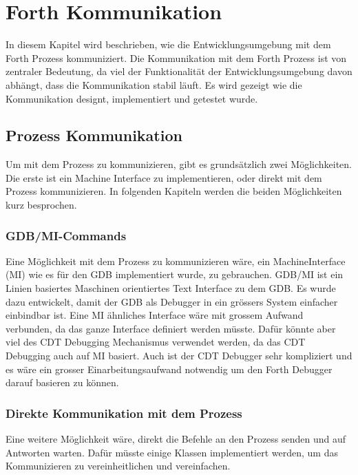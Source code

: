 \chapter{Forth Kommunikation}
\label{forthcommunication}

In diesem Kapitel wird beschrieben, wie die Entwicklungsumgebung mit dem Forth Prozess kommuniziert. Die Kommunikation mit dem Forth Prozess ist von zentraler Bedeutung, da viel der Funktionalität der Entwicklungsumgebung davon abhängt, dass die Kommunikation stabil läuft. Es wird gezeigt wie die Kommunikation designt, implementiert und getestet wurde.

\section{Prozess Kommunikation}
Um mit dem Prozess zu kommunizieren, gibt es grundsätzlich zwei Möglichkeiten. Die erste ist ein Machine Interface zu implementieren, oder direkt mit dem Prozess kommunizieren. In folgenden Kapiteln werden die beiden Möglichkeiten kurz besprochen.

\subsection{GDB/MI-Commands}

Eine Möglichkeit mit dem Prozess zu kommunizieren wäre, ein MachineInterface (MI) wie es für den GDB implementiert wurde, zu gebrauchen. GDB/MI ist ein Linien basiertes Maschinen orientiertes Text Interface zu dem GDB. Es wurde dazu entwickelt, damit der GDB als Debugger in ein grössers System einfacher einbindbar ist.\cite{gdb} Eine MI ähnliches Interface wäre mit grossem Aufwand verbunden, da das ganze Interface definiert werden müsste. Dafür könnte aber viel des CDT Debugging Mechanismus verwendet werden, da das CDT Debugging auch auf MI basiert. Auch ist der CDT Debugger sehr kompliziert und es wäre ein grosser Einarbeitungsaufwand notwendig um den Forth Debugger darauf basieren zu können.\cite{mieclipse}

\subsection{Direkte Kommunikation mit dem Prozess}

Eine weitere Möglichkeit wäre, direkt die Befehle an den Prozess senden und auf Antworten warten. Dafür müsste einige Klassen implementiert werden, um das Kommunizieren zu vereinheitlichen und vereinfachen.

